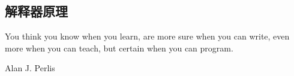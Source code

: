 \documentclass[preview,multi,crop=false,border=1in,class=memoir]{standalone}
\begin{document}
\begin{preview-page}
\chapter{解释器原理}
\epigraph{
You think you know when you learn, are more sure when you can write,
even more when you can teach, but certain when you can program.}{
Alan J. Perlis \cite{Perlis:1982:epigrams}}
\end{preview-page}



\begin{preview-page}
\MakeBib
\end{preview-page}
\end{document}
